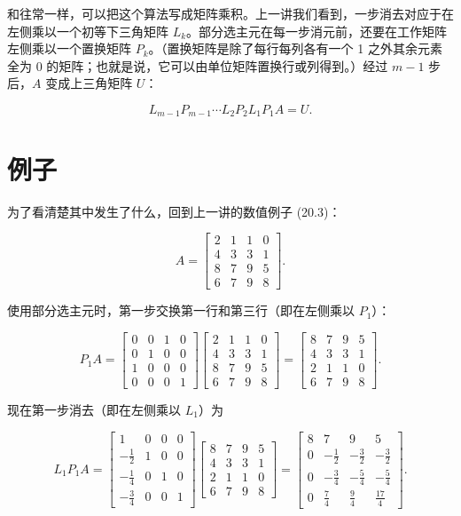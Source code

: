 \documentclass[UTF8,fontset=none,12pt]{ctexart}
\theoremstyle{definition}
\begin{document}
和往常一样，可以把这个算法写成矩阵乘积。上一讲我们看到，一步消去对应于在左侧乘以一个初等下三角矩阵 $L_k$。部分选主元在每一步消元前，还要在工作矩阵左侧乘以一个置换矩阵 $P_k$。（置换矩阵是除了每行每列各有一个 1 之外其余元素全为 0 的矩阵；也就是说，它可以由单位矩阵置换行或列得到。）经过 $m-1$ 步后，$A$ 变成上三角矩阵 $U$：

\begin{equation}
L_{m-1}P_{m-1}\cdots L_2P_2L_1P_1A=U.
\tag{21.1}
\end{equation}

\section*{例子}

为了看清楚其中发生了什么，回到上一讲的数值例子 (20.3)：

\begin{equation}
A=
\begin{bmatrix}
2&1&1&0\\
4&3&3&1\\
8&7&9&5\\
6&7&9&8
\end{bmatrix}.
\tag{21.2}
\end{equation}

使用部分选主元时，第一步交换第一行和第三行（即在左侧乘以 $P_1$）：

$$
P_1A=
\begin{bmatrix}
0&0&1&0\\
0&1&0&0\\
1&0&0&0\\
0&0&0&1
\end{bmatrix}
\begin{bmatrix}
2&1&1&0\\
4&3&3&1\\
8&7&9&5\\
6&7&9&8
\end{bmatrix}
=
\begin{bmatrix}
8&7&9&5\\
4&3&3&1\\
2&1&1&0\\
6&7&9&8
\end{bmatrix}.
$$

现在第一步消去（即在左侧乘以 $L_1$）为

$$
L_1P_1A=
\begin{bmatrix}
1&0&0&0\\
-\frac12&1&0&0\\
-\frac14&0&1&0\\
-\frac34&0&0&1
\end{bmatrix}
\begin{bmatrix}
8&7&9&5\\
4&3&3&1\\
2&1&1&0\\
6&7&9&8
\end{bmatrix}
=
\begin{bmatrix}
8&7&9&5\\
0&-\frac12&-\frac32&-\frac32\\
0&-\frac34&-\frac54&-\frac54\\
0&\frac74&\frac94&\frac{17}4
\end{bmatrix}.
$$
\end{document}
